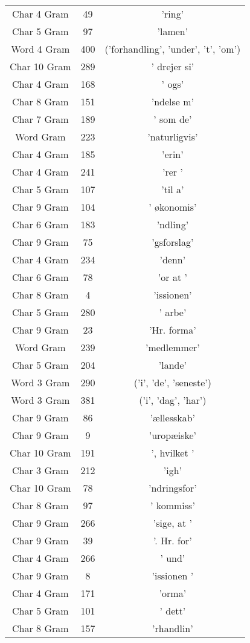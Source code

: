 \begin{table}
\begin{tabular}{ccc}
Char 4 Gram & 49 & 'ring'\\
Char 5 Gram & 97 & 'lamen'\\
Word 4 Gram & 400 & ('forhandling', 'under', 't', 'om')\\
Char 10 Gram & 289 & ' drejer si'\\
Char 4 Gram & 168 & ' ogs'\\
Char 8 Gram & 151 & 'ndelse m'\\
Char 7 Gram & 189 & ' som de'\\
Word Gram & 223 & 'naturligvis'\\
Char 4 Gram & 185 & 'erin'\\
Char 4 Gram & 241 & 'rer '\\
Char 5 Gram & 107 & 'til a'\\
Char 9 Gram & 104 & ' økonomis'\\
Char 6 Gram & 183 & 'ndling'\\
Char 9 Gram & 75 & 'gsforslag'\\
Char 4 Gram & 234 & 'denn'\\
Char 6 Gram & 78 & 'or at '\\
Char 8 Gram & 4 & 'issionen'\\
Char 5 Gram & 280 & ' arbe'\\
Char 9 Gram & 23 & 'Hr. forma'\\
Word Gram & 239 & 'medlemmer'\\
Char 5 Gram & 204 & 'lande'\\
Word 3 Gram & 290 & ('i', 'de', 'seneste')\\
Word 3 Gram & 381 & ('i', 'dag', 'har')\\
Char 9 Gram & 86 & 'ællesskab'\\
Char 9 Gram & 9 & 'uropæiske'\\
Char 10 Gram & 191 & ', hvilket '\\
Char 3 Gram & 212 & 'igh'\\
Char 10 Gram & 78 & 'ndringsfor'\\
Char 8 Gram & 97 & ' kommiss'\\
Char 9 Gram & 266 & 'sige, at '\\
Char 9 Gram & 39 & '. Hr. for'\\
Char 4 Gram & 266 & ' und'\\
Char 9 Gram & 8 & 'issionen '\\
Char 4 Gram & 171 & 'orma'\\
Char 5 Gram & 101 & ' dett'\\
Char 8 Gram & 157 & 'rhandlin'\\

\end{tabular}
\end{table}
